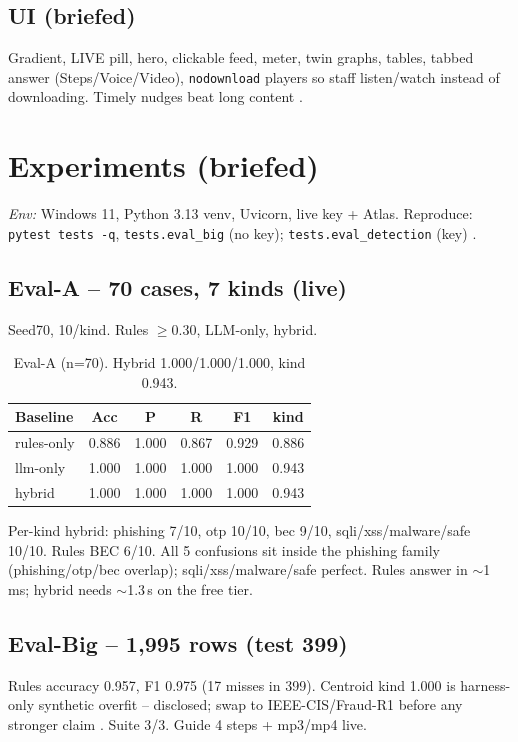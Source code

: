 \documentclass[11pt,a4paper]{article}
\begin{document}
\subsection{UI (briefed)}
Gradient, LIVE pill, hero, clickable feed, meter, twin graphs, tables, tabbed answer (Steps/Voice/Video), \texttt{nodownload} players so staff listen/watch instead of downloading. Timely nudges beat long content \cite{Lain24}.

\section{Experiments (briefed)}
\noindent\textit{Env:} Windows 11, Python 3.13 venv, Uvicorn, live key + Atlas. Reproduce: \texttt{pytest tests -q}, \texttt{tests.eval\_big} (no key); \texttt{tests.eval\_detection} (key) \cite{Pytest24}.

\subsection{Eval-A -- 70 cases, 7 kinds (live)}
Seed70, 10/kind. Rules $\ge$0.30, LLM-only, hybrid.
\begin{table}[h]\centering\caption{Eval-A (n=70). Hybrid 1.000/1.000/1.000, kind 0.943.}\label{tab:a}\begin{tabular}{@{}lccccc@{}}\toprule Baseline & Acc & P & R & F1 & kind\\\midrule
rules-only & 0.886 & 1.000 & 0.867 & 0.929 & 0.886 \\
llm-only & 1.000 & 1.000 & 1.000 & 1.000 & 0.943 \\
hybrid & 1.000 & 1.000 & 1.000 & 1.000 & 0.943 \\\bottomrule\end{tabular}\end{table}
Per-kind hybrid: phishing 7/10, otp 10/10, bec 9/10, sqli/xss/malware/safe 10/10. Rules BEC 6/10. All 5 confusions sit inside the phishing family (phishing/otp/bec overlap); sqli/xss/malware/safe perfect. Rules answer in $\sim$1\,ms; hybrid needs $\sim$1.3\,s on the free tier.

\subsection{Eval-Big -- 1,995 rows (test 399)}
Rules accuracy 0.957, F1 0.975 (17 misses in 399). Centroid kind 1.000 is harness-only synthetic overfit -- disclosed; swap to IEEE-CIS/Fraud-R1 before any stronger claim \cite{FinFraud25,FraudR125}. Suite 3/3. Guide 4 steps + mp3/mp4 live.
\end{document}
